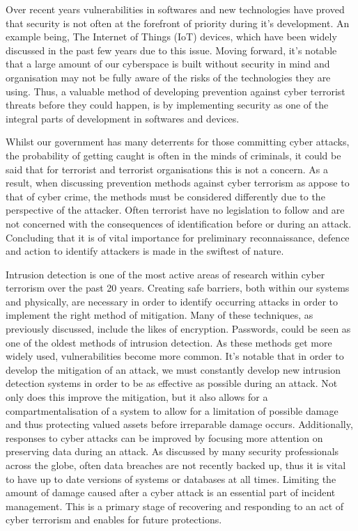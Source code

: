 \documentclass [12pt, a4paper]{article}
\begin{document}
Over recent years vulnerabilities in softwares and new technologies have proved that security is not often at the forefront of priority during it’s development. An example being, The Internet of Things (IoT) devices, which have been widely discussed in the past few years due to this issue. Moving forward, it’s notable that a large amount of our cyberspace is built without security in mind and organisation may not be fully aware of the risks of the technologies they are using. Thus, a valuable method of developing prevention against cyber terrorist threats before they could happen, is by implementing security as one of the integral parts of development in softwares and devices. \\
\par
Whilst our government has many deterrents for those committing cyber attacks, the probability of getting caught is often in the minds of criminals, it could be said that for terrorist and terrorist organisations this is not a concern. As a result, when discussing prevention methods against cyber terrorism as appose to that of cyber crime, the methods must be considered differently due to the perspective of the attacker. Often terrorist have no legislation to follow and are not concerned with the consequences of identification before or during an attack. Concluding that it is of vital importance for preliminary reconnaissance, defence and action to identify attackers is made in the swiftest of nature. \\
\par
Intrusion detection is one of the most active areas of research within cyber terrorism over the past 20 years. Creating safe barriers, both within our systems and physically, are necessary in order to identify occurring attacks in order to implement the right method of mitigation. Many of these techniques, as previously discussed, include the likes of encryption. Passwords, could be seen as one of the oldest methods of intrusion detection. As these methods get more widely used, vulnerabilities become more common. It’s notable that in order to develop the mitigation of an attack, we must constantly develop new intrusion detection systems in order to be as effective as possible during an attack. Not only does this improve the mitigation, but it also allows for a compartmentalisation of a system to allow for a limitation of possible damage and thus protecting valued assets before irreparable damage occurs. Additionally, responses to cyber attacks can be improved by focusing more attention on preserving data during an attack. As discussed by many security professionals across the globe, often data breaches are not recently backed up, thus it is vital to have up to date versions of systems or databases at all times. Limiting the amount of damage caused after a cyber attack is an essential part of incident management. This is a primary stage of recovering and responding to an act of cyber terrorism and enables for future protections.\\
\end{document}

